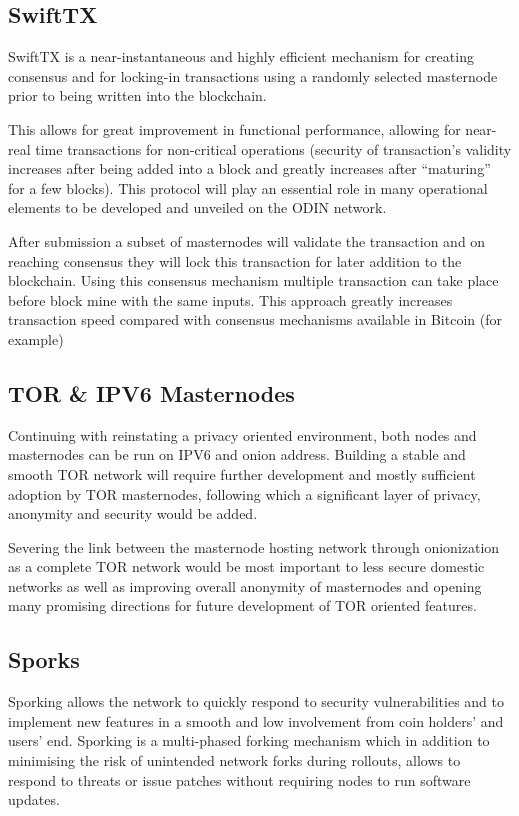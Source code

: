 \subsection{SwiftTX}
SwiftTX is a near-instantaneous and highly efficient mechanism for creating consensus and for locking-in transactions using a randomly selected masternode prior to being written into the blockchain.

This allows for great improvement in functional performance, allowing for near-real time transactions for non-critical operations (security of transaction's validity increases after being added into a block and greatly increases after ``maturing'' for a few blocks). This protocol will play an essential role in many operational elements to be developed and unveiled on the ODIN network.

After submission a subset of masternodes will validate the transaction and on reaching consensus they will lock this transaction for later addition to the blockchain.  Using this consensus mechanism multiple transaction can take place before block mine with the same inputs.  This approach greatly increases transaction speed compared with consensus mechanisms available in Bitcoin (for example)

\subsection{TOR \& IPV6 Masternodes}
Continuing with reinstating a privacy oriented environment, both nodes and masternodes can be run on IPV6 and onion address. Building a stable and smooth TOR network will require further development and mostly sufficient adoption by TOR masternodes, following which a significant layer of privacy, anonymity and security would be added.

Severing the link between the masternode hosting network through onionization as a complete TOR network would be most important to less secure domestic networks as well as improving overall anonymity of masternodes and opening many promising directions for future development of TOR oriented features.

\subsection{Sporks}
Sporking allows the network to quickly respond to security vulnerabilities and to implement new features in a smooth and low involvement from coin holders' and users' end.  Sporking is a multi-phased forking mechanism which in addition to minimising the risk of unintended network forks during rollouts, allows to respond to threats or issue patches without requiring nodes to run software updates.

